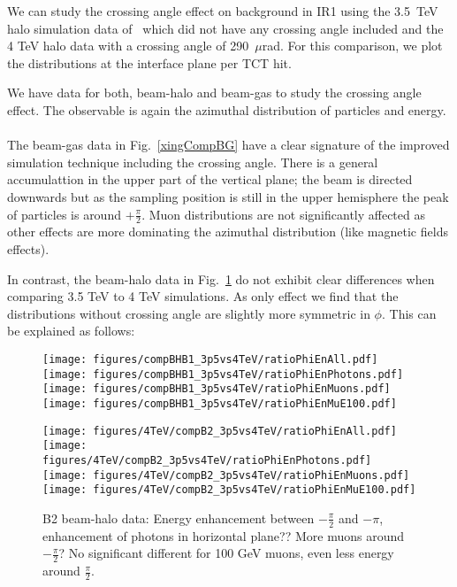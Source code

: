 We can study the crossing angle effect on background in IR1 using the 3.5~TeV halo simulation data of~\cite{nimPaperRod} which did not have any crossing angle included and the 4 TeV halo data with a crossing angle of 290~$\mu$rad. For this comparison, we plot the distributions at the interface plane per TCT hit. 

We have data for both, beam-halo and beam-gas to study the crossing angle effect. The observable is again the azimuthal distribution of particles and energy.\\

{\\} The beam-gas data in Fig.~\ref{xingCompBG} have a clear signature of the improved simulation technique including the crossing angle. There is a general accumulattion in the upper part of the vertical plane; the beam is directed downwards but as the sampling position is still in the upper hemisphere the peak of particles is around $+ \frac{\pi}{2}$. Muon distributions are not significantly affected as other effects are more dominating the azimuthal distribution (like magnetic fields effects). 

In contrast, the beam-halo data in Fig.~\ref{xingCompBH} do not exhibit clear differences when comparing 3.5 TeV to 4 TeV simulations. As only effect we find that the distributions without crossing angle are slightly more symmetric in $\phi$. This can be explained as follows: 

\begin{figure}
\begin{center}
  \texttt{[image: figures/compBHB1\_3p5vs4TeV/ratioPhiEnAll.pdf]}
  \texttt{[image: figures/compBHB1\_3p5vs4TeV/ratioPhiEnPhotons.pdf]}
  \texttt{[image: figures/compBHB1\_3p5vs4TeV/ratioPhiEnMuons.pdf]}
  \texttt{[image: figures/compBHB1\_3p5vs4TeV/ratioPhiEnMuE100.pdf]}

  \texttt{[image: figures/4TeV/compB2\_3p5vs4TeV/ratioPhiEnAll.pdf]}
  \texttt{[image: figures/4TeV/compB2\_3p5vs4TeV/ratioPhiEnPhotons.pdf]}
  \texttt{[image: figures/4TeV/compB2\_3p5vs4TeV/ratioPhiEnMuons.pdf]}
  \texttt{[image: figures/4TeV/compB2\_3p5vs4TeV/ratioPhiEnMuE100.pdf]}
\end{center}
\vspace{-0.6cm}
 \caption{B2 beam-halo data: Energy enhancement between $-\frac{\pi}{2}$ and $-\pi$, enhancement of photons in horizontal plane?? More muons around $-\frac{\pi}{2}$? No significant different for 100 GeV muons, even less energy around $\frac{\pi}{2}$.
  \label{xingCompBH}}
\end{figure}

